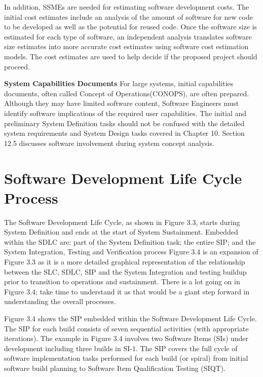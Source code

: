 \documentclass{book}
\begin{document}
In addition, SSMEs are needed for estimating software development costs. The initial cost estimates include an analysis of the amount of software for new code to be developed as well as the potential for reused code. Once the software size is estimated for each type of software, an independent analysis translates software size estimates into more accurate cost estimates using software cost estimation models. The cost estimates are used to help decide if the proposed project should proceed.


\textbf{System Capabilities Documents} For large systems, initial capabilities documents, often called Concept of Operations(CONOPS), are often prepared. Although they may have limited software content, Software Engineers must identify software implications of the required user capabilities. The initial and preliminary System Definition tasks should not be confused with the detailed system requirements and System Design tasks covered in Chapter 10. Section 12.5 discusses software involvement during system concept analysis.

\setcounter{section}{3}
\section{Software Development Life Cycle Process}

 The Software Development Life Cycle, as shown in Figure 3.3, starts during System Definition and ends at the start of System Sustainment. Embedded within the SDLC are: part of the System Definition task; the entire SIP; and the System Integration, Testing and Verification process Figure 3.4 is an expansion of Figure 3.3 as it is a more detailed graphical representation of the relationship between the SLC, SDLC, SIP and the System Integration and testing buildup prior to transition to operations and sustainment.
There is a lot going on in Figure 3.4; take time to understand it as that would be a giant step forward in understanding the overall processes.

Figure 3.4 shows the SIP embedded within the Software Development Life Cycle. The SIP for each build consists of seven sequential activities (with appropriate iterations). The example in Figure 3.4 involves two Software Items (SIs) under development including three builds in SI-1. The SIP covers the full cycle of software implementation tasks performed for each build (or spiral) from initial software build planning to Software Item Qualification Testing (SIQT).
\end{document}
